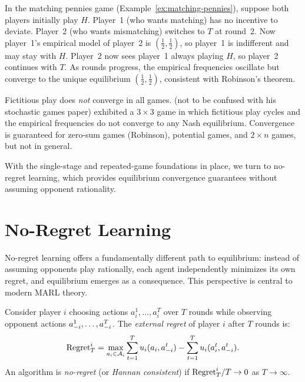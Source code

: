 \documentclass[11pt,a4paper]{article}
\begin{document}
\begin{example}
\label{ex:fp-matching-pennies}
In the matching pennies game (Example~\ref{ex:matching-pennies}),
suppose both players initially play $H$.  Player~1 (who wants
matching) has no incentive to deviate.  Player~2 (who wants
mismatching) switches to $T$ at round~2.  Now player~1's empirical
model of player~2 is $(\tfrac{1}{2}, \tfrac{1}{2})$, so player~1 is
indifferent and may stay with $H$.  Player~2 now sees player~1
always playing $H$, so player~2 continues with $T$.  As rounds
progress, the empirical frequencies oscillate but converge to the
unique equilibrium $(\tfrac{1}{2}, \tfrac{1}{2})$, consistent with
Robinson's theorem.
\end{example}

\begin{warning}
Fictitious play does \emph{not} converge in all games.
\citet{shapley1953} (not to be confused with his stochastic games
paper) exhibited a $3 \times 3$ game in which fictitious play cycles
and the empirical frequencies do not converge to any Nash equilibrium.
Convergence is guaranteed for zero-sum games (Robinson), potential
games, and $2 \times n$ games, but not in general.
\end{warning}

With the single-stage and repeated-game foundations in place, we turn
to no-regret learning, which provides equilibrium convergence
guarantees without assuming opponent rationality.

\section{No-Regret Learning}
\label{sec:no-regret}

No-regret learning offers a fundamentally different path to
equilibrium: instead of assuming opponents play rationally, each agent
independently minimizes its own regret, and equilibrium emerges as a
consequence.  This perspective is central to modern MARL theory.

\begin{definition}
\label{def:external-regret}
Consider player $i$ choosing actions $a_i^1, \ldots, a_i^T$ over
$T$ rounds while observing opponent actions
$a_{-i}^1, \ldots, a_{-i}^T$.  The \emph{external regret} of
player $i$ after $T$ rounds is:
\begin{equation}
\label{eq:external-regret}
  \mathrm{Regret}_T^i = \max_{a_i \in \mathcal{A}_i}
    \sum_{t=1}^{T} u_i(a_i, a_{-i}^t)
    - \sum_{t=1}^{T} u_i(a_i^t, a_{-i}^t).
\end{equation}
An algorithm is \emph{no-regret} (or \emph{Hannan consistent}) if
$\mathrm{Regret}_T^i / T \to 0$ as $T \to \infty$.
\end{definition}
\end{document}
